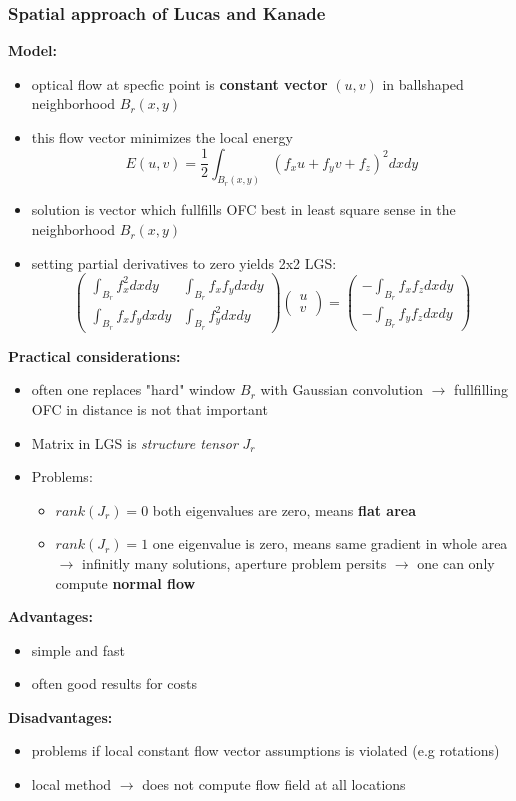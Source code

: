 \documentclass[11pt]{article}
\begin{document}
\subsubsection{Spatial approach of Lucas and Kanade}
\label{sec-3-1-2}
\textbf{Model:}
\begin{itemize}
\item optical flow at specfic point is \textbf{constant vector} $(u,v)$ in 
ballshaped neighborhood $B_r(x,y)$
\item this flow vector minimizes the local energy
      \[ E(u,v) = \frac{1}{2}\int_{B_r(x,y)} (f_xu+f_yv+f_z)^2 dxdy \]
\item solution is vector which fullfills OFC best in least square sense in the
neighborhood $B_r(x,y)$
\item setting partial derivatives to zero yields 2x2 LGS:
      \[ \begin{pmatrix} \int_{B_r}f_x^2 dxdy & \int_{B_r}f_xf_y dxdy \\ 
      \int_{B_r}f_xf_y dxdy & \int_{B_r}f_y^2 dxdy \end{pmatrix}  \begin{pmatrix} 
      u \\ v \end{pmatrix} 
      = \begin{pmatrix} -\int_{B_r}f_x f_z dxdy \\ -\int_{B_r}f_y f_z dxdy \end{pmatrix} \]
\end{itemize}
\textbf{Practical considerations:}
\begin{itemize}
\item often one replaces "hard" window $B_r$ with Gaussian convolution $\rightarrow$
fullfilling OFC in distance is not that important
\item Matrix in LGS is \emph{structure tensor} $J_r$
\item Problems:
\begin{itemize}
\item $rank(J_r) = 0$ both eigenvalues are zero, means \textbf{flat area}
\item $rank(J_r) = 1$ one eigenvalue is zero, means same gradient in whole area
        $\rightarrow$ infinitly many solutions, aperture problem persits
        $\rightarrow$ one can only compute \textbf{normal flow}
\end{itemize}
\end{itemize}
\textbf{Advantages:}
\begin{itemize}
\item simple and fast
\item often good results for costs
\end{itemize}
\textbf{Disadvantages:}
\begin{itemize}
\item problems if local constant flow vector assumptions is violated (e.g rotations)
\item local method $\rightarrow$ does not compute flow field at all locations
\end{itemize}
\end{document}
